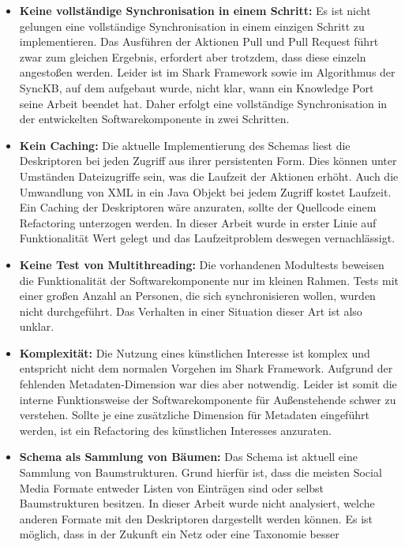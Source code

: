 \documentclass[a4paper]{article}
\begin{document}
	\begin{itemize}
		\item \textbf{Keine vollständige Synchronisation in einem Schritt:}
		Es ist nicht gelungen eine vollständige Synchronisation in einem
		einzigen Schritt zu implementieren. Das Ausführen der Aktionen Pull
		und Pull Request führt zwar zum gleichen Ergebnis, erfordert
		aber trotzdem, dass diese einzeln angestoßen werden. Leider ist im
		Shark Framework sowie im Algorithmus der SyncKB, auf dem aufgebaut wurde, 
		nicht klar, wann ein Knowledge Port seine Arbeit beendet hat. Daher erfolgt
		eine vollständige Synchronisation in der entwickelten Softwarekomponente in 
		zwei Schritten.
		\item \textbf{Kein Caching:} Die aktuelle Implementierung des Schemas
		liest die Deskriptoren bei jeden Zugriff aus ihrer persistenten
		Form. Dies können unter Umständen Dateizugriffe sein, was die Laufzeit
		der Aktionen erhöht. Auch die Umwandlung von XML in ein Java Objekt bei
		jedem Zugriff kostet Laufzeit. Ein Caching der Deskriptoren wäre
		anzuraten, sollte der Quellcode einem Refactoring unterzogen werden.
		In dieser Arbeit wurde in erster Linie auf Funktionalität Wert gelegt
		und das Laufzeitproblem deswegen vernachlässigt. 
		\item \textbf{Keine Test von Multithreading:} Die vorhandenen Modultests
		beweisen die Funktionalität der Softwarekomponente nur im kleinen Rahmen.
		Tests mit einer großen Anzahl an Personen, die sich synchronisieren wollen,
		wurden nicht durchgeführt. Das Verhalten in einer Situation dieser Art ist
		also unklar.
		\item \textbf{Komplexität:} Die Nutzung eines künstlichen Interesse
		ist komplex und entspricht nicht dem normalen Vorgehen im Shark
		Framework. Aufgrund der fehlenden Metadaten-Dimension war dies aber
		notwendig. Leider ist somit die interne Funktionsweise der
		Softwarekomponente für Außenstehende schwer zu verstehen. Sollte
		je eine zusätzliche Dimension für Metadaten eingeführt werden, ist
		ein Refactoring des künstlichen Interesses anzuraten.
		\item \textbf{Schema als Sammlung von Bäumen:} Das Schema ist aktuell
		eine Sammlung von Baumstrukturen. Grund hierfür ist, dass die meisten
		Social Media Formate entweder Listen von Einträgen sind oder selbst
		Baumstrukturen besitzen. In dieser Arbeit wurde nicht analysiert,
		welche anderen Formate mit den Deskriptoren dargestellt werden können.
		Es ist möglich, dass in der Zukunft ein Netz oder eine Taxonomie besser 

\end{itemize}
\end{document}
